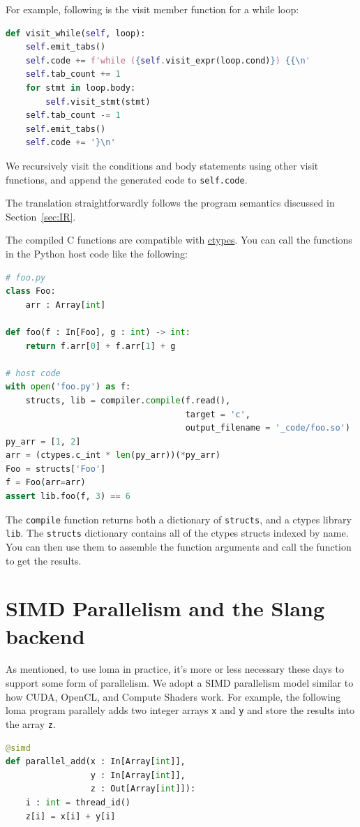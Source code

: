 For example, following is the visit member function for a while loop:
\begin{lstlisting}[language=python]
def visit_while(self, loop):
    self.emit_tabs()
    self.code += f'while ({self.visit_expr(loop.cond)}) {{\n'
    self.tab_count += 1
    for stmt in loop.body:
        self.visit_stmt(stmt)
    self.tab_count -= 1
    self.emit_tabs()
    self.code += '}\n'
\end{lstlisting}

We recursively visit the conditions and body statements using other visit functions, and append the generated code to \lstinline{self.code}.

The translation straightforwardly follows the program semantics discussed in Section~\ref{sec:IR}.

The compiled C functions are compatible with \href{https://docs.python.org/3/library/ctypes.html}{ctypes}. You can call the functions in the Python host code like the following:
\begin{lstlisting}[language=python]
# foo.py
class Foo:
    arr : Array[int]

def foo(f : In[Foo], g : int) -> int:
    return f.arr[0] + f.arr[1] + g

# host code
with open('foo.py') as f:
    structs, lib = compiler.compile(f.read(),
                                    target = 'c',
                                    output_filename = '_code/foo.so')
py_arr = [1, 2]
arr = (ctypes.c_int * len(py_arr))(*py_arr)
Foo = structs['Foo']
f = Foo(arr=arr)
assert lib.foo(f, 3) == 6
\end{lstlisting}

The \lstinline{compile} function returns both a dictionary of \lstinline{structs}, and a ctypes library \lstinline{lib}. The \lstinline{structs} dictionary contains all of the ctypes structs indexed by name. You can then use them to assemble the function arguments and call the function to get the results.

\section{SIMD Parallelism and the Slang backend}

As mentioned, to use loma in practice, it's more or less necessary these days to support some form of parallelism. We adopt a SIMD parallelism model similar to how CUDA, OpenCL, and Compute Shaders work. For example, the following loma program parallely adds two integer arrays \lstinline{x} and \lstinline{y} and store the results into the array \lstinline{z}.
\begin{lstlisting}[language=python] 
@simd
def parallel_add(x : In[Array[int]],
                 y : In[Array[int]],
                 z : Out[Array[int]]):
    i : int = thread_id()
    z[i] = x[i] + y[i]
\end{lstlisting}


